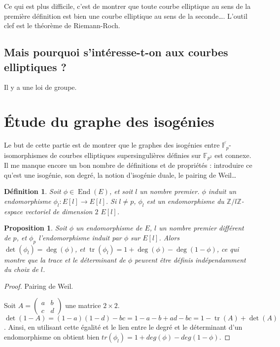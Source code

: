 \documentclass{article}
\theoremstyle{plain}%
\newtheorem{prop}[thm]{Proposition}
\newtheorem{deff}[thm]{Définition}
\theoremstyle{definition}%
\newcommand{\F}{\mathbb{F}}
\newcommand{\Z}{\mathbb{Z}}
\DeclareMathOperator{\End}{End}
\DeclareMathOperator{\tr}{tr}
\begin{document}
Ce qui est plus difficile, c'est de montrer que toute courbe elliptique au sens de la première définition est bien une courbe elliptique au sens de la seconde\ldots. L'outil clef est le théorème de Riemann-Roch.

\subsection{Mais pourquoi s'intéresse-t-on aux courbes elliptiques ?}

Il y a une loi de groupe.

\section{Étude du graphe des isogénies}

Le but de cette partie est de montrer que le graphes des isogénies entre $\overline{\F_p}$-isomorphismes de courbes elliptiques supersingulières définies sur $\F_{p^2}$ est connexe. Il me manque encore un bon nombre de définitions et de propriétés : introduire ce qu'est une isogénie, son degré, la notion d'isogénie duale, le pairing de Weil\ldots

\begin{deff}
  Soit $\phi\in \End(E)$, et soit $l$ un nombre premier. $\phi$ induit un endomorphisme $\phi_l : E[l] \to E[l]$. Si $l\neq p$, $\phi_l$ est un endomorphisme du $\Z/l\Z$-espace vectoriel de dimension $2$ $E[l]$. 
\end{deff}

\begin{prop}
  \label{dettr}
  Soit $\phi$ un endomorphisme de $E$, $l$ un nombre premier différent de $p$, et $\phi_p$ l'endomorphisme induit par $\phi$ sur $E[l]$. Alors $\det(\phi_l) = \deg(\phi)$, et $\tr(\phi_l) = 1 + \deg(\phi) - \deg(1-\phi)$, ce qui montre que la trace et le déterminant de $\phi$ peuvent être définis indépendamment du choix de $l$.
\end{prop}

\begin{proof}
  Pairing de Weil.

  Soit $ A = \begin{pmatrix} a & b \\ c & d \end{pmatrix}$ une matrice $2\times 2$. $\det(1-A) = (1-a)(1-d) - bc = 1 -a -b + ad -bc = 1 - \tr(A) + \det(A)$. Ainsi, en utilisant cette égalité et le lien entre le degré et le déterminant d'un endomorphisme on obtient bien $tr(\phi_l) = 1 + deg(\phi) - deg(1-\phi)$.   
\end{proof}
\end{document}
